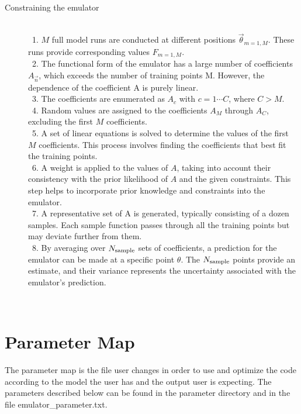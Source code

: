 \documentclass[12pt]{article}
\numberwithin{equation}{section}
\numberwithin{figure}{section}
\begin{document}
\begin{description}
\item[Constraining the emulator] \
\\
\ 1. $M$ full model runs are conducted at different positions $\vec{\theta}_{m=1,M}$. These runs provide corresponding values $F_{m=1,M}$. \\

\ 2. The functional form of the emulator has a large number of coefficients $A_{\vec{n}}$, which exceeds the number of training points M. However, the dependence of the coefficient A is purely linear. \\

\ 3. The coefficients are enumerated as $A_c$ with $c=1\cdots C$, where $C>M$.\\

\ 4. Random values are assigned to the coefficients $A_M$ through $A_C$, excluding the first $M$ coefficients. \\

\ 5. A set of linear equations is solved to determine the values of the first $M$ coefficients. This process involves finding the coefficients that best fit the training points. \\

\ 6. A weight is applied to the values of $A$, taking into account their consistency with the prior likelihood of $A$ and the given constraints. This step helps to incorporate prior knowledge and constraints into the emulator. \\

\ 7. A representative set of A is generated, typically consisting of a dozen samples. Each sample function passes through all the training points but may deviate further from them. \\

\ 8. By averaging over $N_{\rm sample}$ sets of coefficients, a prediction for the emulator can be made at a specific point $\theta$. The $N_{\rm sample}$ points provide an estimate, and their variance represents the uncertainty associated with the emulator's prediction. \\

\end{description}\


\appendix


\section{Parameter Map}
The parameter map is the file user changes in order to use and optimize the code according to the model the user has and the output user is expecting. The parameters described below can be found in the parameter directory and in the file emulator\_parameter.txt.
\end{document}

